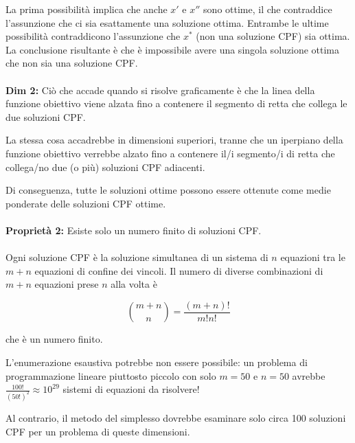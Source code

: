 \documentclass[a4paper, 11pt]{article}
\begin{document}
        La prima possibilità implica che anche $x'$ e $x''$ sono ottime, il che contraddice l'assunzione che ci sia esattamente una soluzione ottima. Entrambe le ultime possibilità contraddicono l'assunzione che $x^*$ (non una soluzione CPF) sia ottima. La conclusione risultante è che è impossibile avere una singola soluzione ottima che non sia una soluzione CPF.

        \paragraph{}
        \textbf{Dim 2:} Ciò che accade quando si risolve graficamente è che la linea della funzione obiettivo viene alzata fino a contenere il segmento di retta che collega le due soluzioni CPF.

        La stessa cosa accadrebbe in dimensioni superiori, tranne che un iperpiano della funzione obiettivo verrebbe alzato fino a contenere il/i segmento/i di retta che collega/no due (o più) soluzioni CPF adiacenti.

        Di conseguenza, tutte le soluzioni ottime possono essere ottenute come medie ponderate delle soluzioni CPF ottime.

        
        \paragraph{}
        \textbf{Proprietà 2:} Esiste solo un numero finito di soluzioni CPF.

        \paragraph{}
        Ogni soluzione CPF è la soluzione simultanea di un sistema di $n$ equazioni tra le $m + n$ equazioni di confine dei vincoli. Il numero di diverse combinazioni di $m + n$ equazioni prese $n$ alla volta è

        $$
            \binom{m+n}{n} = \frac{(m+n)!}{m!n!}
        $$

        che è un numero finito.

        L'enumerazione esaustiva potrebbe non essere possibile: un problema di programmazione lineare piuttosto piccolo con solo $m = 50$ e $n = 50$ avrebbe $\frac{100!}{(50!)^2} \approx 10^{29}$ sistemi di equazioni da risolvere!

        Al contrario, il metodo del simplesso dovrebbe esaminare solo circa 100 soluzioni CPF per un problema di queste dimensioni.
\end{document}
